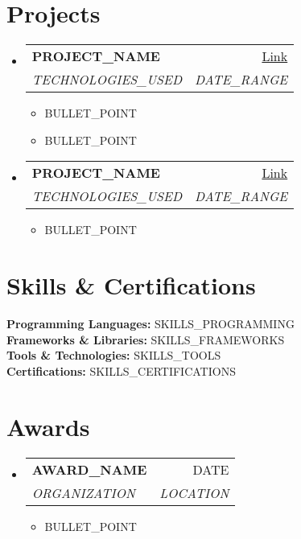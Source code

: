 \documentclass[letterpaper,10pt]{article}
\makeatletter
\newcommand{\resumeItem}[1]{
  \item\small{#1}
}
\newcommand{\resumeSubheading}[4]{
  \vspace{1pt}
  \item
    \begin{tabular*}{0.97\textwidth}[t]{l@{\extracolsep{\fill}}r}
      \textbf{#1} & #2 \\
      \textit{#3} & \textit{#4} \\
    \end{tabular*}\vspace{1pt}
}
\newcommand{\skillCategory}[2]{
  \textbf{#1:} #2\\[2pt]
}
\makeatother
\begin{document}
\section{Projects}
\begin{itemize}[leftmargin=0.15in, label={}, itemsep=2pt]
    \resumeSubheading
      {PROJECT\_NAME}{\href{PROJECT\_LINK}{Link}}
      {TECHNOLOGIES\_USED}{DATE\_RANGE}
      \begin{itemize}[leftmargin=0.15in, label=\textbullet, itemsep=0pt]
        \resumeItem{BULLET\_POINT}
        \resumeItem{BULLET\_POINT}
      \end{itemize}
    
    \resumeSubheading
      {PROJECT\_NAME}{\href{PROJECT\_LINK}{Link}}
      {TECHNOLOGIES\_USED}{DATE\_RANGE}
      \begin{itemize}[leftmargin=0.15in, label=\textbullet, itemsep=0pt]
        \resumeItem{BULLET\_POINT}
      \end{itemize}
\end{itemize}

\section{Skills \& Certifications}
\skillCategory{Programming Languages}{SKILLS\_PROGRAMMING}
\skillCategory{Frameworks \& Libraries}{SKILLS\_FRAMEWORKS}
\skillCategory{Tools \& Technologies}{SKILLS\_TOOLS}
\skillCategory{Certifications}{SKILLS\_CERTIFICATIONS}

\section{Awards}
\begin{itemize}[leftmargin=0.15in, label={}, itemsep=2pt]
    \resumeSubheading
      {AWARD\_NAME}{DATE}
      {ORGANIZATION}{LOCATION}
      \begin{itemize}[leftmargin=0.15in, label=\textbullet, itemsep=0pt]
        \resumeItem{BULLET\_POINT}
      \end{itemize}
\end{itemize}
\end{document}
